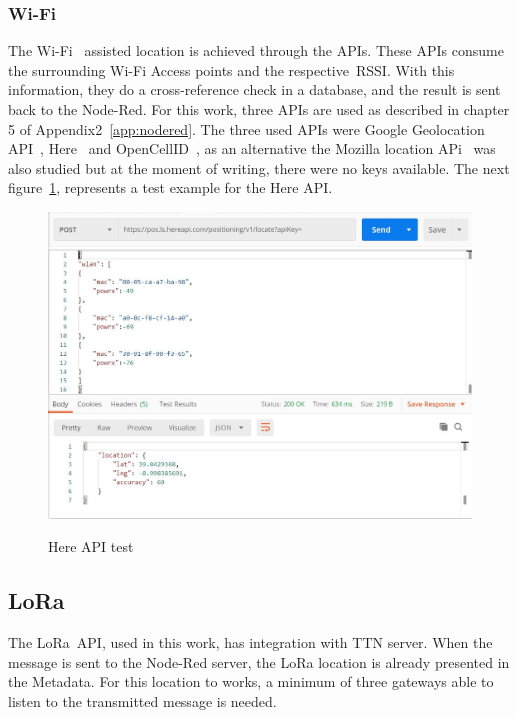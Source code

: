 \subsubsection{Wi-Fi} %
\label{sec:wifi_sota}
The Wi-Fi~\cite{wifi} assisted location is achieved through the APIs. These APIs consume the surrounding Wi-Fi Access points and the respective~\gls{RSSI}. With this information, they do a cross-reference check in a database, and the result is sent back to the Node-Red. For this work, three APIs are used as described in chapter 5 of Appendix2~\ref{app:nodered}. The three used APIs were Google Geolocation API~\cite{GoogleLocation}, Here~\cite{Here} and OpenCellID~\cite{OpenCell}, as an alternative the Mozilla location APi~\cite{Mozilla} was also studied but at the moment of writing, there were no keys available. The next figure~\ref{fig:Google_API}, represents a test example for the Here API.\newline


 
  \begin{figure}[htbp]
  \centering
  
    {\includegraphics[width=\linewidth]{Chapters/Figures/herepost.JPG}}
 
  \caption{Here API test}
  \label{fig:Google_API}
\end{figure}








\newpage
\subsection{LoRa} %
\label{sec:lora_api_sota}
The LoRa~\gls{API}, used in this work, has  integration with TTN server. When the message is sent to the Node-Red server, the LoRa location is already presented in the Metadata. For this location to works, a minimum of three gateways able to listen to the transmitted message is needed.

